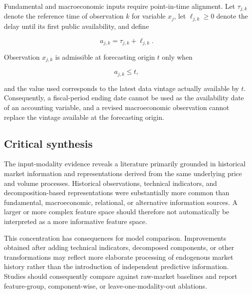 \documentclass[pdflatex,sn-mathphys-num]{sn-jnl}%
\theoremstyle{thmstyleone}%
\theoremstyle{thmstyletwo}%
\theoremstyle{thmstylethree}%
\begin{document}
Fundamental and macroeconomic inputs require point-in-time alignment.
Let \(\tau_{j,k}\) denote the reference time of observation \(k\) for
variable \(x_j\), let \(\ell_{j,k}\geq 0\) denote the delay until its
first public availability, and define

\begin{equation}
a_{j,k}=\tau_{j,k}+\ell_{j,k}.
\label{eq:point-in-time-availability}
\end{equation}

Observation \(x_{j,k}\) is admissible at forecasting origin \(t\) only
when

\begin{equation}
a_{j,k}\leq t,
\label{eq:point-in-time-admissibility}
\end{equation}

and the value used corresponds to the latest data vintage actually
available by \(t\). Consequently, a fiscal-period ending date cannot be
used as the availability date of an accounting variable, and a revised
macroeconomic observation cannot replace the vintage available at the
forecasting origin.









\subsection{Critical synthesis}
\label{subsec:input-critical-synthesis}

The input-modality evidence reveals a literature primarily grounded in
historical market information and representations derived from the
same underlying price and volume processes. Historical observations,
technical indicators, and decomposition-based representations were
substantially more common than fundamental, macroeconomic, relational,
or alternative information sources. A larger or more complex feature
space should therefore not automatically be interpreted as a more
informative feature space.

This concentration has consequences for model comparison. Improvements
obtained after adding technical indicators, decomposed components, or
other transformations may reflect more elaborate processing of
endogenous market history rather than the introduction of independent
predictive information. Studies should consequently compare against
raw-market baselines and report feature-group, component-wise, or
leave-one-modality-out ablations.
\end{document}
